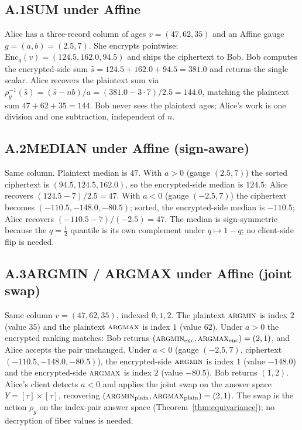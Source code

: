 \documentclass[11pt,letterpaper]{article}
\begin{document}
\subsection*{A.1\quad SUM under Affine}
Alice has a three-record column of ages
$v = (47, 62, 35)$ and an Affine gauge $g = (a, b) = (2.5, 7)$.
She encrypts pointwise: $\mathrm{Enc}_g(v) = (124.5, 162.0, 94.5)$
and ships the ciphertext to Bob. Bob computes the encrypted-side
sum $\hat{s} = 124.5 + 162.0 + 94.5 = 381.0$ and returns the
single scalar. Alice recovers the plaintext sum via
$\rho_g^{-1}(\hat{s}) = (\hat{s} - nb)/a = (381.0 - 3 \cdot 7)/2.5
= 144.0$, matching the plaintext sum $47 + 62 + 35 = 144$.
Bob never sees the plaintext ages; Alice's work is one division
and one subtraction, independent of $n$.

\subsection*{A.2\quad MEDIAN under Affine (sign-aware)}
Same column. Plaintext median is $47$. With $a > 0$ (gauge
$(2.5, 7)$) the sorted ciphertext is $(94.5, 124.5, 162.0)$, so
the encrypted-side median is $124.5$; Alice recovers
$(124.5 - 7)/2.5 = 47$. With $a < 0$ (gauge $(-2.5, 7)$) the
ciphertext becomes $(-110.5, -148.0, -80.5)$; sorted, the
encrypted-side median is $-110.5$; Alice recovers
$(-110.5 - 7)/(-2.5) = 47$. The median is sign-symmetric because
the $q = \tfrac{1}{2}$ quantile is its own complement under
$q \mapsto 1 - q$; no client-side flip is needed.

\subsection*{A.3\quad ARGMIN / ARGMAX under Affine (joint swap)}
Same column $v = (47, 62, 35)$, indexed $0, 1, 2$. The plaintext
$\textsc{argmin}$ is index $2$ (value $35$) and the plaintext
$\textsc{argmax}$ is index $1$ (value $62$). Under $a > 0$ the
encrypted ranking matches: Bob returns $(\textsc{argmin}_{\text{enc}},
\textsc{argmax}_{\text{enc}}) = (2, 1)$, and Alice accepts the pair
unchanged. Under $a < 0$ (gauge $(-2.5, 7)$, ciphertext
$(-110.5, -148.0, -80.5)$), the encrypted-side
$\textsc{argmin}$ is index $1$ (value $-148.0$) and the
encrypted-side $\textsc{argmax}$ is index $2$ (value $-80.5$).
Bob returns $(1, 2)$. Alice's client detects $a < 0$ and applies
the joint swap on the answer space
$Y = [\tau] \times [\tau]$, recovering
$(\textsc{argmin}_{\text{plain}}, \textsc{argmax}_{\text{plain}})
= (2, 1)$. The swap is the action $\rho_g$ on the index-pair
answer space (Theorem~\ref{thm:equivariance}); no decryption of
fiber values is needed.
\end{document}
